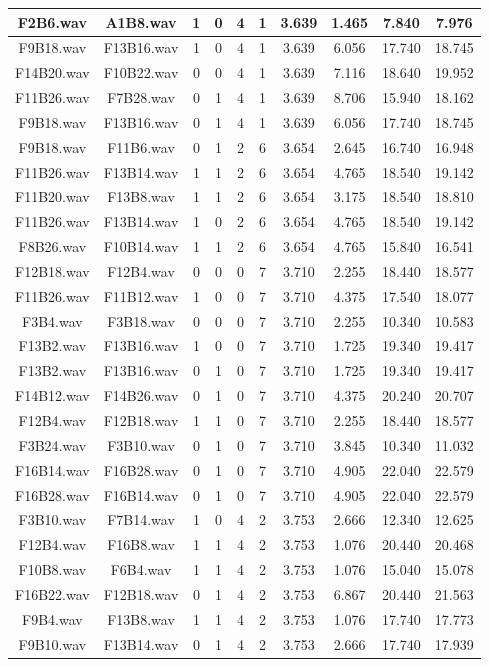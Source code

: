 \documentclass[11pt,a4paper]{book}
\begin{document}
\begin{longtable}[c]{|c|c|c|c|c|c|c|c|c|c|}
F2B6.wav&A1B8.wav&1&0&4&1&3.639&1.465&7.840&7.976\\ \hline
F9B18.wav&F13B16.wav&1&0&4&1&3.639&6.056&17.740&18.745\\ \hline
F14B20.wav&F10B22.wav&0&0&4&1&3.639&7.116&18.640&19.952\\ \hline
F11B26.wav&F7B28.wav&0&1&4&1&3.639&8.706&15.940&18.162\\ \hline
F9B18.wav&F13B16.wav&0&1&4&1&3.639&6.056&17.740&18.745\\ \hline
F9B18.wav&F11B6.wav&0&1&2&6&3.654&2.645&16.740&16.948\\ \hline
F11B26.wav&F13B14.wav&1&1&2&6&3.654&4.765&18.540&19.142\\ \hline
F11B20.wav&F13B8.wav&1&1&2&6&3.654&3.175&18.540&18.810\\ \hline
F11B26.wav&F13B14.wav&1&0&2&6&3.654&4.765&18.540&19.142\\ \hline
F8B26.wav&F10B14.wav&1&1&2&6&3.654&4.765&15.840&16.541\\ \hline
F12B18.wav&F12B4.wav&0&0&0&7&3.710&2.255&18.440&18.577\\ \hline
F11B26.wav&F11B12.wav&1&0&0&7&3.710&4.375&17.540&18.077\\ \hline
F3B4.wav&F3B18.wav&0&0&0&7&3.710&2.255&10.340&10.583\\ \hline
F13B2.wav&F13B16.wav&1&0&0&7&3.710&1.725&19.340&19.417\\ \hline
F13B2.wav&F13B16.wav&0&1&0&7&3.710&1.725&19.340&19.417\\ \hline
F14B12.wav&F14B26.wav&0&1&0&7&3.710&4.375&20.240&20.707\\ \hline
F12B4.wav&F12B18.wav&1&1&0&7&3.710&2.255&18.440&18.577\\ \hline
F3B24.wav&F3B10.wav&0&1&0&7&3.710&3.845&10.340&11.032\\ \hline
F16B14.wav&F16B28.wav&0&1&0&7&3.710&4.905&22.040&22.579\\ \hline
F16B28.wav&F16B14.wav&0&1&0&7&3.710&4.905&22.040&22.579\\ \hline
F3B10.wav&F7B14.wav&1&0&4&2&3.753&2.666&12.340&12.625\\ \hline
F12B4.wav&F16B8.wav&1&1&4&2&3.753&1.076&20.440&20.468\\ \hline
F10B8.wav&F6B4.wav&1&1&4&2&3.753&1.076&15.040&15.078\\ \hline
F16B22.wav&F12B18.wav&0&1&4&2&3.753&6.867&20.440&21.563\\ \hline
F9B4.wav&F13B8.wav&1&1&4&2&3.753&1.076&17.740&17.773\\ \hline
F9B10.wav&F13B14.wav&0&1&4&2&3.753&2.666&17.740&17.939\\ \hline

\end{longtable}
\end{document}
